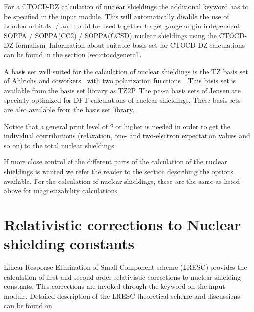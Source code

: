 For a CTOCD-DZ calculation of nuclear shieldings the
additional keyword  has to be specified in the
 input module. This will automatically disable the use
of London orbitals.  /  and  could be
used together to get gauge origin independent SOPPA / SOPPA(CC2) /
SOPPA(CCSD) nuclear shieldings using the CTOCD-DZ formalism.
Information about suitable basis set for CTOCD-DZ calculations can be
found in the section \ref{sec:ctocdgeneral}.

A basis set well suited for the calculation of nuclear shieldings is
the TZ basis set of Ahlrichs and
coworkers~\cite{ashhrajcp97,aschrajcp100} with two polarization
functions~\cite{thmjkrcr99}. This basis set is available from the basis
set library as TZ2P. The pcs-n basis sets of Jensen
\cite{bs08-jctc4-719} are specially optimized for DFT calculations of
nuclear shieldings. These basis sets are also available from the basis
set library.

Notice that a general print level of 2 or higher is needed in order to
get the individual contributions (relaxation, one- and
two-electron expectation values and so on) to the total nuclear shieldings.

If more close control of the different parts of the calculation of the
nuclear shieldings is wanted we refer the reader to the section
describing the options available. For the calculation of nuclear
shieldings, these are the same as listed above for magnetizability
calculations.



\section{Relativistic corrections to Nuclear shielding constants}\label{sec:lresc}

Linear Response Elimination of Small Component scheme (LRESC) provides the calculation
of first and second order relativistic corrections to nuclear shielding constants. 
This corrections are invoked through the keyword  on the  input module. Detailed description of the LRESC theoretical scheme and discussions can be found on

